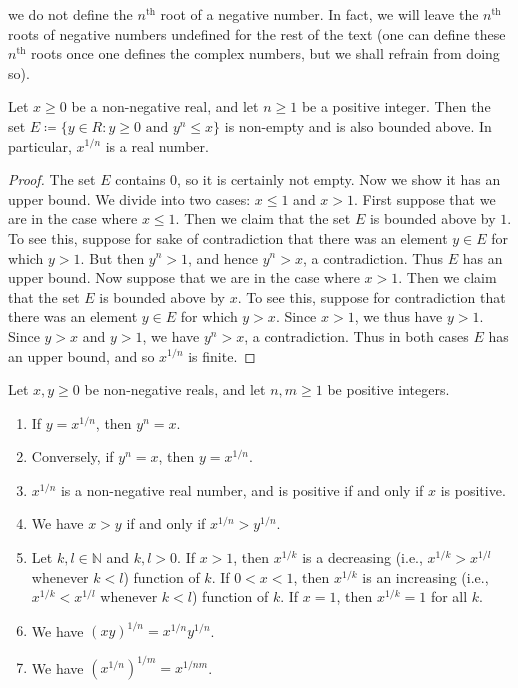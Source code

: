 \begin{note}
we do not define the \(n^{\text{th}}\) root of a negative number.
In fact, we will leave the \(n^{\text{th}}\) roots of negative numbers undefined for the rest of the text
(one can define these \(n^{\text{th}}\) roots once one defines the complex numbers, but we shall refrain from doing so).
\end{note}

\begin{lemma}\label{5.6.5}
Let \(x \geq 0\) be a non-negative real, and let \(n \geq 1\) be a positive integer.
Then the set \(E \coloneqq \{y \in R : y \geq 0 \text{ and } y^n \leq x\}\) is non-empty and is also bounded above.
In particular, \(x^{1 / n}\) is a real number.
\end{lemma}

\begin{proof}
The set \(E\) contains \(0\), so it is certainly not empty.
Now we show it has an upper bound.
We divide into two cases: \(x \leq 1\) and \(x > 1\).
First suppose that we are in the case where \(x \leq 1\).
Then we claim that the set \(E\) is bounded above by \(1\).
To see this, suppose for sake of contradiction that there was an element \(y \in E\) for which \(y > 1\).
But then \(y^n > 1\), and hence \(y^n > x\), a contradiction.
Thus \(E\) has an upper bound.
Now suppose that we are in the case where \(x > 1\).
Then we claim that the set \(E\) is bounded above by \(x\).
To see this, suppose for contradiction that there was an element \(y \in E\) for which \(y > x\).
Since \(x > 1\), we thus have \(y > 1\).
Since \(y > x\) and \(y > 1\), we have \(y^n > x\), a contradiction.
Thus in both cases \(E\) has an upper bound, and so \(x^{1 / n}\) is finite.
\end{proof}

\begin{lemma}\label{5.6.6}
Let \(x, y \geq 0\) be non-negative reals, and let \(n, m \geq 1\) be positive integers.
\begin{enumerate}
    \item If \(y = x^{1 / n}\), then \(y^n = x\).
    \item Conversely, if \(y^n = x\), then \(y = x^{1 / n}\).
    \item \(x^{1 / n}\) is a non-negative real number, and is positive if and only if \(x\) is positive.
    \item We have \(x > y\) if and only if \(x^{1 / n} > y^{1 / n}\).
    \item Let \(k, l \in \mathds{N}\) and \(k, l > 0\).
    If \(x > 1\), then \(x^{1 / k}\) is a decreasing (i.e., \(x^{1 / k} > x^{1 / l}\) whenever \(k < l\)) function of \(k\).
    If \(0 < x < 1\), then \(x^{1 / k}\) is an increasing (i.e., \(x^{1 / k} < x^{1 / l}\) whenever \(k < l\)) function of \(k\).
    If \(x = 1\), then \(x^{1 / k} = 1\) for all \(k\).
    \item We have \((xy)^{1 / n} = x^{1 / n} y^{1 / n}\).
    \item We have \((x^{1 / n})^{1 / m} = x^{1 / nm}\).
\end{enumerate}
\end{lemma}

